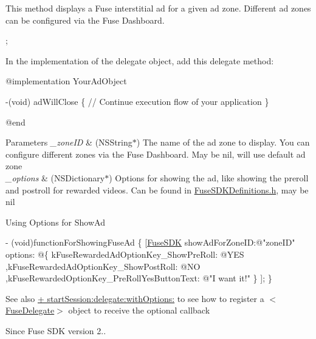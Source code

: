 This method displays a Fuse interstitial ad for a given ad zone. Different ad zones can be configured via the Fuse Dashboard. 


\begin{DoxyCode}
;
\end{DoxyCode}


In the implementation of the delegate object, add this delegate method\+:


\begin{DoxyCode}
\textcolor{keyword}{@implementation }YourAdObject

-(void) adWillClose
\{
   \textcolor{comment}{// Continue execution flow of your application}
\}

\textcolor{keyword}{@end}
\end{DoxyCode}



\begin{DoxyParams}{Parameters}
{\em \+\_\+zone\+I\+D} & (N\+S\+String$\ast$) The name of the ad zone to display. You can configure different zones via the Fuse Dashboard. May be nil, will use default ad zone \\
\hline
{\em \+\_\+options} & (N\+S\+Dictionary$\ast$) Options for showing the ad, like showing the preroll and postroll for rewarded videos. Can be found in \hyperlink{_fuse_s_d_k_definitions_8h_source}{Fuse\+S\+D\+K\+Definitions.\+h}, may be nil\\
\hline
\end{DoxyParams}
Using Options for Show\+Ad 
\begin{DoxyCode}
- (void)functionForShowingFuseAd
\{
   [\hyperlink{interface_fuse_s_d_k}{FuseSDK} showAdForZoneID:\textcolor{stringliteral}{@"zoneID"} options: 
       @\{ kFuseRewardedAdOptionKey\_ShowPreRoll: @YES
       ,kFuseRewardedAdOptionKey\_ShowPostRoll: @NO
       ,kFuseRewardedOptionKey\_PreRollYesButtonText: \textcolor{stringliteral}{@"I want it!"} \}
   ];
\}
\end{DoxyCode}


\begin{DoxySeeAlso}{See also}
\hyperlink{interface_fuse_s_d_k_adf7ed64a02b9540c9ded4b931ea4e400}{+ start\+Session\+:delegate\+:with\+Options\+:} to see how to register a $<$\hyperlink{protocol_fuse_delegate-p}{Fuse\+Delegate}$>$ object to receive the optional callback 
\end{DoxySeeAlso}
\begin{DoxySince}{Since}
Fuse S\+D\+K version 2.. 
\end{DoxySince}
\hypertarget{interface_fuse_s_d_k_adf7ed64a02b9540c9ded4b931ea4e400}{}
